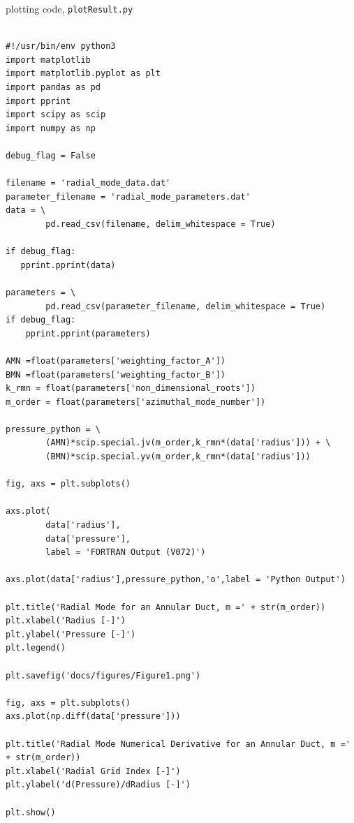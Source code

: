 \documentclass[12pt]{article}
\begin{document}
plotting code, \verb|plotResult.py|
\begin{verbatim}

#!/usr/bin/env python3
import matplotlib
import matplotlib.pyplot as plt
import pandas as pd
import pprint 
import scipy as scip
import numpy as np

debug_flag = False

filename = 'radial_mode_data.dat'
parameter_filename = 'radial_mode_parameters.dat'
data = \
        pd.read_csv(filename, delim_whitespace = True)

if debug_flag:
   pprint.pprint(data)

parameters = \
        pd.read_csv(parameter_filename, delim_whitespace = True)
if debug_flag:
    pprint.pprint(parameters)

AMN =float(parameters['weighting_factor_A'])
BMN =float(parameters['weighting_factor_B'])
k_rmn = float(parameters['non_dimensional_roots'])
m_order = float(parameters['azimuthal_mode_number'])

pressure_python = \
        (AMN)*scip.special.jv(m_order,k_rmn*(data['radius'])) + \
        (BMN)*scip.special.yv(m_order,k_rmn*(data['radius']))

fig, axs = plt.subplots()

axs.plot(
        data['radius'],
        data['pressure'],
        label = 'FORTRAN Output (V072)')

axs.plot(data['radius'],pressure_python,'o',label = 'Python Output')

plt.title('Radial Mode for an Annular Duct, m =' + str(m_order))
plt.xlabel('Radius [-]')
plt.ylabel('Pressure [-]')
plt.legend()

plt.savefig('docs/figures/Figure1.png')

fig, axs = plt.subplots()
axs.plot(np.diff(data['pressure']))

plt.title('Radial Mode Numerical Derivative for an Annular Duct, m =' + str(m_order))
plt.xlabel('Radial Grid Index [-]')
plt.ylabel('d(Pressure)/dRadius [-]')

plt.show()



\end{verbatim}

 
\end{document}

